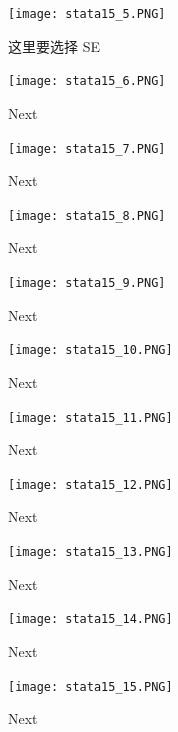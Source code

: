 \documentclass[cn,fancy,blue,11pt]{elegantbook}
\begin{document}
\begin{figure}[htbp]
  \centering
  \texttt{[image: stata15\_5.PNG]}
  \caption{这里要选择 SE}
  \label{fig:stata15_5}
\end{figure}

\begin{figure}[htbp]
  \centering
  \texttt{[image: stata15\_6.PNG]}
  \caption{Next}
  \label{fig:stata15_6}
\end{figure}

\begin{figure}[htbp]
  \centering
  \texttt{[image: stata15\_7.PNG]}
  \caption{Next}
  \label{fig:stata15_7}
\end{figure}

\begin{figure}[htbp]
  \centering
  \texttt{[image: stata15\_8.PNG]}
  \caption{Next}
  \label{fig:stata15_8}
\end{figure}

\begin{figure}[htbp]
  \centering
  \texttt{[image: stata15\_9.PNG]}
  \caption{Next}
  \label{fig:stata15_9}
\end{figure}

\begin{figure}[htbp]
  \centering
  \texttt{[image: stata15\_10.PNG]}
  \caption{Next}
  \label{fig:stata15_10}
\end{figure}

\begin{figure}[htbp]
  \centering
  \texttt{[image: stata15\_11.PNG]}
  \caption{Next}
  \label{fig:stata15_11}
\end{figure}

\begin{figure}[htbp]
  \centering
  \texttt{[image: stata15\_12.PNG]}
  \caption{Next}
  \label{fig:stata15_12}
\end{figure}

\begin{figure}[htbp]
  \centering
  \texttt{[image: stata15\_13.PNG]}
  \caption{Next}
  \label{fig:stata15_13}
\end{figure}

\begin{figure}[htbp]
  \centering
  \texttt{[image: stata15\_14.PNG]}
  \caption{Next}
  \label{fig:stata15_14}
\end{figure}

\begin{figure}[htbp]
  \centering
  \texttt{[image: stata15\_15.PNG]}
  \caption{Next}
  \label{fig:stata15_15}
\end{figure}
\end{document}
